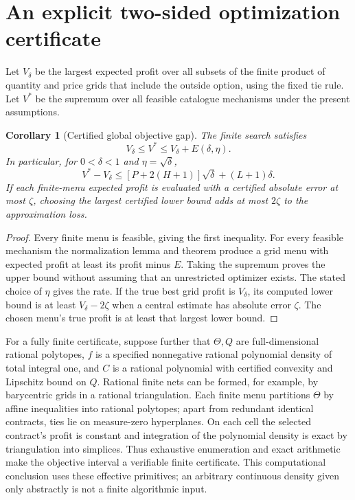 \documentclass[11pt]{article}
\newtheorem{corollary}[theorem]{Corollary}
\theoremstyle{definition}
\theoremstyle{remark}
\begin{document}
\section{An explicit two-sided optimization certificate}
Let $V_\delta$ be the largest expected profit over all subsets of the finite product of quantity and price grids that include the outside option, using the fixed tie rule. Let $V^*$ be the supremum over all feasible catalogue mechanisms under the present assumptions.

\begin{corollary}[Certified global objective gap]
The finite search satisfies
\[
 V_\delta\le V^*\le V_\delta+E(\delta,\eta).
\]
In particular, for $0<\delta<1$ and $\eta=\sqrt\delta$,
\[
 V^*-V_\delta\le [P+2(H+1)]\sqrt\delta+(L+1)\delta.
\]
If each finite-menu expected profit is evaluated with a certified absolute error at most $\zeta$, choosing the largest certified lower bound adds at most $2\zeta$ to the approximation loss.
\end{corollary}
\begin{proof}
Every finite menu is feasible, giving the first inequality. For every feasible mechanism the normalization lemma and theorem produce a grid menu with expected profit at least its profit minus $E$. Taking the supremum proves the upper bound without assuming that an unrestricted optimizer exists. The stated choice of $\eta$ gives the rate. If the true best grid profit is $V_\delta$, its computed lower bound is at least $V_\delta-2\zeta$ when a central estimate has absolute error $\zeta$. The chosen menu's true profit is at least that largest lower bound.
\end{proof}

For a fully finite certificate, suppose further that $\Theta,Q$ are full-dimensional rational polytopes, $f$ is a specified nonnegative rational polynomial density of total integral one, and $C$ is a rational polynomial with certified convexity and Lipschitz bound on $Q$. Rational finite nets can be formed, for example, by barycentric grids in a rational triangulation. Each finite menu partitions $\Theta$ by affine inequalities into rational polytopes; apart from redundant identical contracts, ties lie on measure-zero hyperplanes. On each cell the selected contract's profit is constant and integration of the polynomial density is exact by triangulation into simplices. Thus exhaustive enumeration and exact arithmetic make the objective interval a verifiable finite certificate. This computational conclusion uses these effective primitives; an arbitrary continuous density given only abstractly is not a finite algorithmic input.
\end{document}
